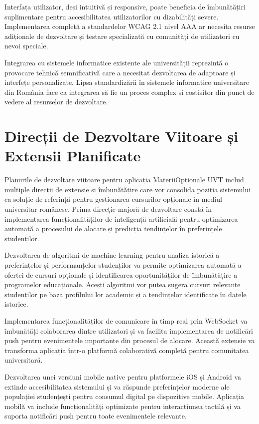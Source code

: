 \documentclass[12pt,a4paper]{report}
\begin{document}
Interfața utilizator, deși intuitivă și responsive, poate beneficia de îmbunătățiri suplimentare pentru accesibilitatea utilizatorilor cu dizabilități severe. Implementarea completă a standardelor WCAG 2.1 nivel AAA \cite{accessibility-wcag} ar necesita resurse adiționale de dezvoltare și testare specializată cu comunități de utilizatori cu nevoi speciale.

Integrarea cu sistemele informatice existente ale universității reprezintă o provocare tehnică semnificativă care a necesitat dezvoltarea de adaptoare și interfețe personalizate. Lipsa standardizării în sistemele informatice universitare din România face ca integrarea să fie un proces complex și costisitor din punct de vedere al resurselor de dezvoltare.

\section{Direcții de Dezvoltare Viitoare și Extensii Planificate}

Planurile de dezvoltare viitoare pentru aplicația MateriiOptionale UVT includ multiple direcții de extensie și îmbunătățire care vor consolida poziția sistemului ca soluție de referință pentru gestionarea cursurilor opționale în mediul universitar românesc. Prima direcție majoră de dezvoltare constă în implementarea funcționalităților de inteligență artificială pentru optimizarea automată a procesului de alocare și predicția tendințelor în preferințele studenților.

Dezvoltarea de algoritmi de machine learning pentru analiza istorică a preferințelor și performanțelor studenților va permite optimizarea automată a ofertei de cursuri opționale și identificarea oportunităților de îmbunătățire a programelor educaționale. Acești algoritmi vor putea sugera cursuri relevante studenților pe baza profilului lor academic și a tendințelor identificate în datele istorice.

Implementarea funcționalităților de comunicare în timp real prin WebSocket va îmbunătăți colaborarea dintre utilizatori și va facilita implementarea de notificări push pentru evenimentele importante din procesul de alocare. Această extensie va transforma aplicația într-o platformă colaborativă completă pentru comunitatea universitară.

Dezvoltarea unei versiuni mobile native pentru platformele iOS și Android va extinde accesibilitatea sistemului și va răspunde preferințelor moderne ale populației studențești pentru consumul digital pe dispozitive mobile. Aplicația mobilă va include funcționalități optimizate pentru interacțiunea tactilă și va suporta notificări push pentru toate evenimentele relevante.
\end{document}
